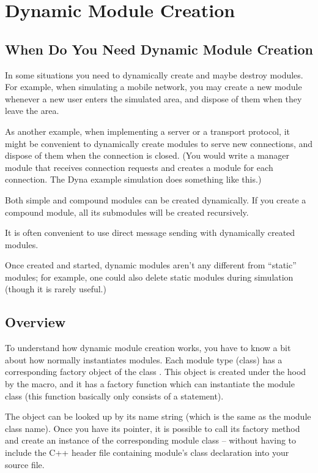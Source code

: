 \section{Dynamic Module Creation}
\label{sec:simple-modules:dynamic-module-creation}

\subsection{When Do You Need Dynamic Module Creation}

In some situations you need to dynamically create and maybe destroy
modules. For example, when simulating a mobile network,
you may create a new module whenever a new user enters
the simulated area, and dispose of them when they leave the area.

As another example, when implementing a server or a transport
protocol, it might be convenient to dynamically create modules
to serve new connections, and dispose of them when the connection
is closed. (You would write a manager module that receives connection
requests and creates a module for each connection.
The Dyna example simulation does something like this.)

Both simple and compound modules can be created dynamically.
If you create a compound module, all its submodules will be created
recursively.

It is often convenient to use direct message sending with dynamically
created modules.

Once created and started, dynamic modules aren't any different from
``static'' modules; for example, one could also delete static modules
during simulation (though it is rarely useful.)


\subsection{Overview}


To understand how dynamic module creation works, you have to know a
bit about how normally {\opp} instantiates modules. Each module type
(class) has a corresponding factory object of the class
. This object is created under the hood by the
 macro, and it has a factory
function which can instantiate the module
class (this function basically only consists of a  statement).

The  object can be looked up by its name
string (which is the same as the module class name). Once you have its
pointer, it is possible to call its factory method and create an
instance of the corresponding module class -- without having to
include the C++ header file containing module's class declaration
into your source file.

